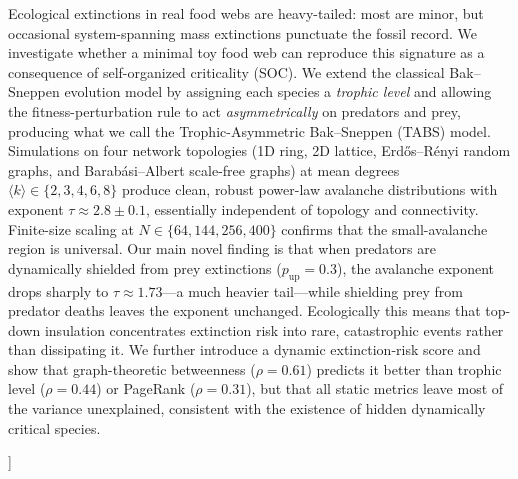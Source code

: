 \documentclass[10pt,a4paper,twocolumn]{article}
\begin{document}
\begin{@twocolumnfalse}
{\begin{minipage}{\dimexpr\textwidth-2\fboxsep-2\fboxrule\relax}
Ecological extinctions in real food webs are heavy-tailed: most are minor, but occasional system-spanning mass extinctions punctuate the fossil record. We investigate whether a minimal toy food web can reproduce this signature as a consequence of self-organized criticality (SOC). We extend the classical Bak--Sneppen evolution model by assigning each species a \emph{trophic level} and allowing the fitness-perturbation rule to act \emph{asymmetrically} on predators and prey, producing what we call the Trophic-Asymmetric Bak--Sneppen (TABS) model. Simulations on four network topologies (1D ring, 2D lattice, Erd\H{o}s--R\'enyi random graphs, and Barab\'asi--Albert scale-free graphs) at mean degrees $\langle k \rangle \in \{2,3,4,6,8\}$ produce clean, robust power-law avalanche distributions with exponent $\tau \approx 2.8 \pm 0.1$, essentially independent of topology and connectivity. Finite-size scaling at $N \in \{64,144,256,400\}$ confirms that the small-avalanche region is universal. Our main novel finding is that when predators are dynamically shielded from prey extinctions ($p_{\text{up}} = 0.3$), the avalanche exponent drops sharply to $\tau \approx 1.73$---a much heavier tail---while shielding prey from predator deaths leaves the exponent unchanged. Ecologically this means that top-down insulation concentrates extinction risk into rare, catastrophic events rather than dissipating it. We further introduce a dynamic extinction-risk score and show that graph-theoretic betweenness ($\rho = 0.61$) predicts it better than trophic level ($\rho = 0.44$) or PageRank ($\rho = 0.31$), but that all static metrics leave most of the variance unexplained, consistent with the existence of hidden dynamically critical species.

\vspace{5pt}
\vspace{4pt}
\end{minipage}}
\vspace{0.8em}
\end{@twocolumnfalse}]
\end{document}
